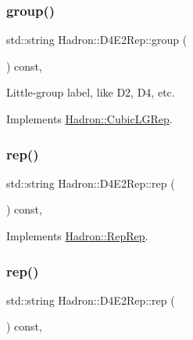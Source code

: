\subsubsection{\texorpdfstring{group()}{group()}\hspace{0.1cm}{\footnotesize\ttfamily [3/3]}}
{\footnotesize\ttfamily std\+::string Hadron\+::\+D4\+E2\+Rep\+::group (\begin{DoxyParamCaption}{ }\end{DoxyParamCaption}) const\hspace{0.3cm}{\ttfamily [inline]}, {\ttfamily [virtual]}}

Little-\/group label, like D2, D4, etc. 

Implements \mbox{\hyperlink{structHadron_1_1CubicLGRep_a9bdb14b519a611d21379ed96a3a9eb41}{Hadron\+::\+Cubic\+L\+G\+Rep}}.

\mbox{\label{structHadron_1_1D4E2Rep_aa3fbc4ce5b4a84a739b17fa4bc49e97d}} 
\subsubsection{\texorpdfstring{rep()}{rep()}\hspace{0.1cm}{\footnotesize\ttfamily [1/3]}}
{\footnotesize\ttfamily std\+::string Hadron\+::\+D4\+E2\+Rep\+::rep (\begin{DoxyParamCaption}{ }\end{DoxyParamCaption}) const\hspace{0.3cm}{\ttfamily [inline]}, {\ttfamily [virtual]}}



Implements \mbox{\hyperlink{structHadron_1_1RepRep_ab3213025f6de249f7095892109575fde}{Hadron\+::\+Rep\+Rep}}.

\mbox{\label{structHadron_1_1D4E2Rep_aa3fbc4ce5b4a84a739b17fa4bc49e97d}} 
\subsubsection{\texorpdfstring{rep()}{rep()}\hspace{0.1cm}{\footnotesize\ttfamily [2/3]}}
{\footnotesize\ttfamily std\+::string Hadron\+::\+D4\+E2\+Rep\+::rep (\begin{DoxyParamCaption}{ }\end{DoxyParamCaption}) const\hspace{0.3cm}{\ttfamily [inline]}, {\ttfamily [virtual]}}



